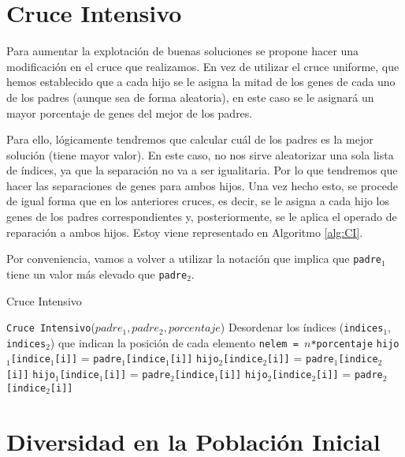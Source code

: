 \section{Cruce Intensivo}

Para aumentar la explotación de buenas soluciones se propone hacer una modificación en el cruce que realizamos. 
En vez de utilizar el cruce uniforme, que hemos establecido que a cada hijo se le asigna la mitad de los genes de cada uno de los padres (aunque sea de forma aleatoria), en este caso se le asignará un mayor porcentaje de genes del mejor de los padres. 

Para ello, lógicamente tendremos que calcular cuál de los padres es la mejor solución (tiene mayor valor). 
En este caso, no nos sirve aleatorizar una sola lista de índices, ya que la separación no va a ser igualitaria. 
Por lo que tendremos que hacer las separaciones de genes para ambos hijos. 
Una vez hecho esto, se procede de igual forma que en los anteriores cruces, es decir, se le asigna a cada hijo los genes de los padres correspondientes y, posteriormente, se le aplica el operado de reparación a ambos hijos. 
Estoy viene representado en Algoritmo \ref{alg:CI}. 

Por conveniencia, vamos a volver a utilizar la notación que implica que \texttt{padre$_1$} tiene un valor más elevado que \texttt{padre$_2$}.

\begin{algorithm}
\caption{Cruce Intensivo}\label{alg:CI}
\begin{algorithmic}[1]
\Procedure \texttt{Cruce Intensivo}($padre_1, padre_2, porcentaje$)
\State Desordenar los índices (\texttt{indices$_1$}, \texttt{indices$_2$}) que indican la posición de cada elemento
\State \texttt{nelem = $n$*porcentaje}
		\State \texttt{hijo$_1$[indice$_1$[i]]} = \texttt{padre$_1$[indice$_1$[i]]}
		\State \texttt{hijo$_2$[indice$_2$[i]]} = \texttt{padre$_1$[indice$_2$[i]]}
	\Else
		\State \texttt{hijo$_1$[indice$_1$[i]]} = \texttt{padre$_2$[indice$_1$[i]]}
		\State \texttt{hijo$_2$[indice$_2$[i]]} = \texttt{padre$_2$[indice$_2$[i]]}
	\EndIf
\EndFor
\EndProcedure
\end{algorithmic}
\end{algorithm}


\section{Diversidad en la Población Inicial}

